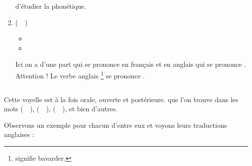 \begin{enumerate}
    d'étudier la phonétique.
  \item {} (~~)
    \begin{itemize}
    \item {}
    \item {}
    \end{itemize}
    Ici on a d'une part  qui se prononce
    \href{http://www.wordreference.com/fren/chat}{} en français et
     en anglais qui se prononce
    \href{http://www.wordreference.com/enfr/cat}{}. Attention !
    Le verbe anglais \footnote{ signifie
      bavarder.} se prononce
    \href{https://en.oxforddictionaries.com/definition/chat}{}. 
\end{enumerate}

\subsection{}\label{subsec:ɑ}

Cette voyelle est à la fois orale, ouverte et postérieure. 
que l'on trouve dans les mots  (~~),
 (~~),  (~~), et bien d'autres.

Observons un exemple pour chacun d'entre eux et voyons leurs
traductions anglaises :\par

